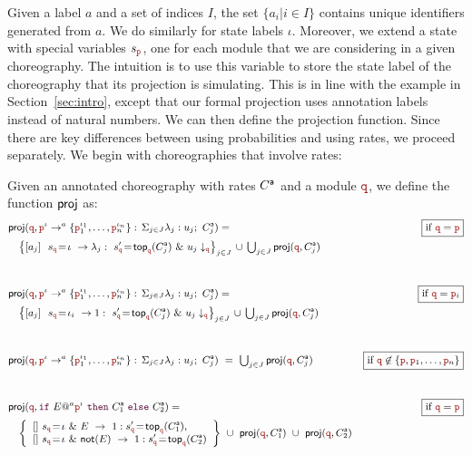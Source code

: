 Given a label $a$ and a set of indices $I$, the set $\{a_i|i\in I\}$
contains unique identifiers generated from $a$.  We do similarly for
state labels $\iota$. Moreover, we extend a state with special
variables $s_{\nr}$, one for each module that we are considering in a
given choreography.
The intuition is to use this variable to store the state label of the
choreography that its projection is simulating. This is in line with
the example in Section~\ref{sec:intro}, except that our formal
projection uses annotation labels instead of natural numbers.
We can then define the projection function. Since there are key
differences between using probabilities and using rates, we proceed
separately. We begin with choreographies that involve rates:
\begin{defi}\label{def:projCTMC} Given
  an annotated choreography with rates ${C}^{\mathsf a}$ and a module
  $\nrr$, %
  we define the function $\mathsf{proj}$ as:
  \begin{displaymath}\small
    \begin{array}{@{}lr@{}}
      \proj
      (\nrr,\interactl{\nr^{\iota}}{a}{\nr_1^{\iota_1},\ldots,\nr_n^{\iota_n}})=
      &  \boxed{\text{if }\nrr=\nr}\\[2mm]
      \quad
      \left\{\commandBase {a_j} {\ s_{\nrr}\!=\! \iota} {\lambda_j:}
      \ s_{\nrr}'\!=\! \mathsf{top}_{\nrr}(\anno{C}_j)\ 
      \&\ \projE {u_j}\nrr\right\}_{j\in J}
      \,\cup\, \bigcup_{j\in J} \proj (\nrr, \anno{C}_j)
      \\[1cm]
          
      \proj
      (\nrr,\interactl{\nr^{\iota}}{a}{\nr_1^{\iota_1},\ldots,\nr_n^{\iota_n}})=
      &  \boxed{\text{if }
        \nrr= \nr_i}\\[2mm]
      \quad
      \left\{\commandBase {a_j} {\ s_{\nrr}\!=\! \iota_i} {1:\ s_{\nrr}'\!=\!
      \mathsf{top}_{\nrr}(\anno{C}_j)
      }
      \ \&\ \projE {u_j}\nrr\right\}_{j\in J}
      \,\cup\, \bigcup_{j\in J} \proj (\role q, \anno{C}_j)
      \\[1cm]
      
      \proj
      (\nrr,\interactl{\nr^\iota}a{\nr_1^{\iota_1},\ldots,\nr_n^{\iota_n}})\ =
      \ \bigcup_{j\in J} \proj (\role q, \anno{C}_j)
      &  \boxed{\text{if }\role q\not\in\{\role p, 
        \nr_1,\ldots,\nr_n\}}
      \\[1cm]

      \proj (\nrr,\ifTEl {E}a{\nr^\iota}{\anno C_1}{\anno C_2}) = 
      &  \boxed{\text{if }\nrr=\nr}\\[2mm]
      \quad\left\{ 
      \begin{array}{lll}
        \commandBase {} {s_{\nrr}\!=\! \iota\ \&\ E}{\ 1: s'_{\nrr}\!=\!
        \mathsf{top}_{\nrr}(\anno C_1)},\\ 
        \commandBase {} {s_{\nrr}\!=\! \iota\ \&\ \mathsf{not}(E)}
        {\ 1: s'_{\nrr}\!=\! \mathsf{top}_{\nrr}(\anno C_2)}
      \end{array}
      \right\}
      \ \cup\ \proj (\nrr, \anno C_1)
      \ \cup\
      \proj (\nrr, \anno C_2)
      \\[1cm]


\end{array}
\end{displaymath}
\end{defi}
